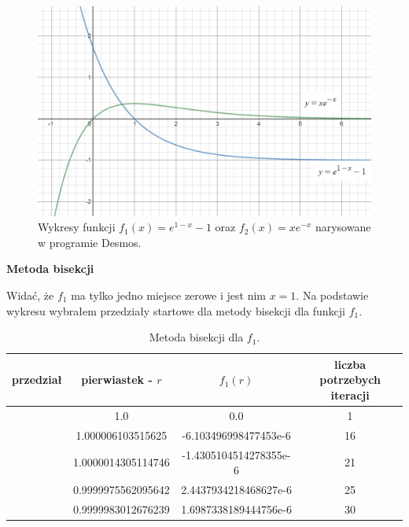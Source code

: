 \documentclass[]{article}
\begin{document}
	\begin{figure}[!htbp]
		\includegraphics[width=\textwidth]{e1-x-1andxe-x.png}
		\centering
		\caption{Wykresy funkcji $f_1(x)=e^{1-x}-1$ oraz $f_2(x)=xe^{-x}$ narysowane w programie Desmos.}
	\end{figure}
	\noindent\textbf{Metoda bisekcji}

	\noindent Widać, że $f_1$ ma tylko jedno miejsce zerowe i jest nim $x=1$. Na podstawie wykresu wybrałem przedziały startowe dla metody bisekcji dla funkcji $f_1$.
	
	\begin{table}[!h]
		\centering
		\label{tab:table1}
		\begin{tabular}{|c|c|c|c|}
			\hline
			przedział & pierwiastek - $r$ & $f_1(r)$ & liczba potrzebych iteracji\\
			\hline
			[0.0, 2.0] & 1.0 & 0.0 & 1 \\ \hline
			[0.4, 2.4] & 1.000006103515625 & -6.103496998477453e-6 & 16 \\ \hline
			[-10.0, 25.0] & 1.0000014305114746 & -1.4305104514278355e-6 & 21 \\ \hline
			[-450.0, 500.0] & 0.9999975562095642 & 2.4437934218468627e-6 & 25 \\ \hline
			[-10000.0, 10000.0] & 0.9999983012676239 & 1.6987338189444756e-6 & 30 \\ \hline
		\end{tabular}
	\caption*{Metoda bisekcji dla $f_1$.}
	\end{table}
\end{document}
